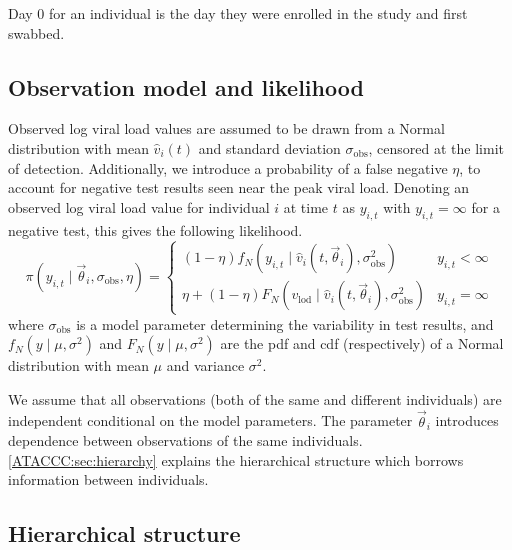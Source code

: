 \documentclass[thesis.tex]{subfiles}
\begin{document}
Day 0 for an individual is the day they were enrolled in the study and first swabbed.

\subsection{Observation model and likelihood}

Observed log viral load values are assumed to be drawn from a Normal distribution with mean $\hat{v}_i(t)$ and standard deviation $\sigma_\text{obs}$, censored at the limit of detection.
Additionally, we introduce a probability of a false negative $\eta$, to account for negative test results seen near the peak viral load.
Denoting an observed log viral load value for individual $i$ at time $t$ as $y_{i,t}$ with
$y_{i,t} = \infty$ for a negative test, this gives the following likelihood.
$$
\pi(y_{i,t} \mid \vec\theta_i, \sigma_\text{obs}, \eta) = \begin{cases}
  (1 - \eta) f_N(y_{i,t} \mid \hat{v}_i(t, \vec\theta_i), \sigma_\text{obs}^2) &y_{i,t} < \infty \\
  \eta + (1 - \eta) F_N(v_\text{lod} \mid \hat{v}_i(t, \vec\theta_i), \sigma_\text{obs}^2) & y_{i,t} = \infty
\end{cases}
$$
where $\sigma_\text{obs}$ is a model parameter determining the variability in
test results, and $f_N(y \mid \mu, \sigma^2)$ and $F_N(y \mid \mu, \sigma^2)$ are the pdf
and cdf (respectively) of a Normal distribution with mean $\mu$ and variance $\sigma^2$.

We assume that all observations (both of the same and different individuals) are independent conditional on the model parameters.
The parameter $\vec\theta_i$ introduces dependence between observations of the same individuals.
\autoref{ATACCC:sec:hierarchy} explains the hierarchical structure which borrows information between individuals.

\subsection{Hierarchical structure}\label{ATACCC:sec:hierarchy}
\end{document}
